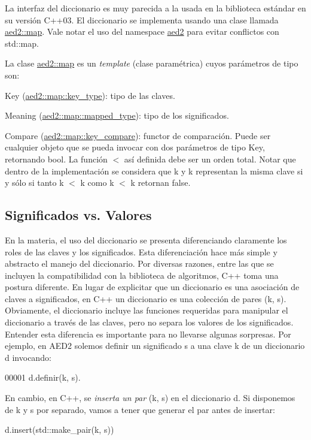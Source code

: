 La interfaz del diccionario es muy parecida a la usada en la biblioteca estándar en su versión C++03. El diccionario se implementa usando una clase llamada \hyperlink{classaed2_1_1map}{aed2\+::map}. Vale notar el uso del namespace \hyperlink{namespaceaed2}{aed2} para evitar conflictos con std\+::map.

La clase \hyperlink{classaed2_1_1map}{aed2\+::map} es un {\itshape template} (clase paramétrica) cuyos parámetros de tipo son\+:
\begin{DoxyItemize}
\item Key (\hyperlink{classaed2_1_1map_a4273e8812e7105a618df58a2c8b72b7d_a4273e8812e7105a618df58a2c8b72b7d}{aed2\+::map\+::key\+\_\+type})\+: tipo de las claves.
\item Meaning (\hyperlink{classaed2_1_1map_aa3e34bf624f3009884a71b18f4ddae40_aa3e34bf624f3009884a71b18f4ddae40}{aed2\+::map\+::mapped\+\_\+type})\+: tipo de los significados.
\item Compare (\hyperlink{classaed2_1_1map_a3efa081d3379ab76f33a5ef9fe697523_a3efa081d3379ab76f33a5ef9fe697523}{aed2\+::map\+::key\+\_\+compare})\+: functor de comparación. Puede ser cualquier objeto que se pueda invocar con dos parámetros de tipo Key, retornando {\ttfamily bool}. La función $<$ así definida debe ser un orden total. Notar que dentro de la implementación se considera que {\ttfamily k} y {\ttfamily k\textquotesingle{}} representan la misma clave si y sólo si tanto {\ttfamily k} $<$ {\ttfamily k\textquotesingle{}} como {\ttfamily k\textquotesingle{}} $<$ {\ttfamily k} retornan {\ttfamily false}.
\end{DoxyItemize}\hypertarget{Interfaz_Diferencias}{}\subsection{Significados vs. Valores}\label{Interfaz_Diferencias}
En la materia, el uso del diccionario se presenta diferenciando claramente los roles de las claves y los significados. Esta diferenciación hace más simple y abstracto el manejo del diccionario. Por diversas razones, entre las que se incluyen la compatibilidad con la biblioteca de algoritmos, C++ toma una postura diferente. En lugar de explicitar que un diccionario es una asociación de claves a significados, en C++ un diccionario es una colección de pares {\ttfamily (k, s)}. Obviamente, el diccionario incluye las funciones requeridas para manipular el diccionario a través de las claves, pero no separa los valores de los significados. Entender esta diferencia es importante para no llevarse algunas sorpresas. Por ejemplo, en A\+E\+D2 solemos definir un significado {\ttfamily s} a una clave {\ttfamily k} de un diccionario {\ttfamily d} invocando\+: 
\begin{DoxyCode}
00001 d.definir(k, s).
\end{DoxyCode}
 En cambio, en C++, se {\itshape inserta un par} {\ttfamily (k, s)} en el diccionario {\ttfamily d}. Si disponemos de {\ttfamily k} y {\ttfamily s} por separado, vamos a tener que generar el par antes de insertar\+: 
\begin{DoxyCode}
d.insert(std::make\_pair(k, s))
\end{DoxyCode}


